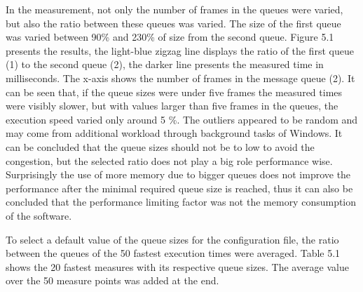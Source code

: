 In the measurement, not only the number of frames in the queues were varied, but also the ratio between these queues was varied. The size of the first queue was varied between 90\% and 230\% of size from the second queue. Figure 5.1 presents the results, the light-blue zigzag line displays the ratio of the first queue (1) to the second queue (2), the darker line presents the measured time in milliseconds. The x-axis shows the number of frames in the message queue (2). It can be seen that, if the queue sizes were under five frames the measured times were visibly slower, but with values larger than five frames in the queues, the execution speed varied only around 5 \%. The outliers appeared to be random and may come from additional workload through background tasks of Windows. It can be concluded that the queue sizes should not be to low to avoid the congestion, but the selected ratio does not play a big role performance wise. Surprisingly the use of more memory due to bigger queues does not improve the performance after the minimal required queue size is reached, thus it can also be concluded that the performance limiting factor was not the memory consumption of the software.

To select a default value of the queue sizes for the configuration file, the ratio between the queues of the 50 fastest execution times were averaged. Table 5.1 shows the 20 fastest measures with its respective queue sizes. The average value over the 50 measure points was added at the end. 

